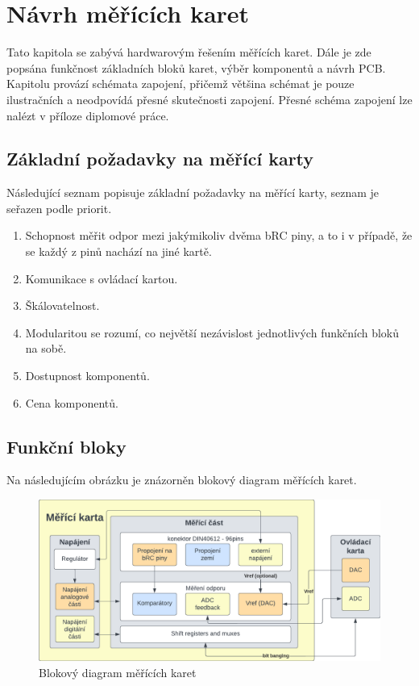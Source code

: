
\chapter{Návrh měřících karet}
Tato kapitola se zabývá hardwarovým řešením měřících karet. Dále je zde popsána funkčnost základních bloků karet, výběr komponentů a návrh PCB.
Kapitolu provází schémata zapojení, přičemž většina schémat je pouze ilustračních a neodpovídá přesné skutečnosti zapojení.
Přesné schéma zapojení lze nalézt v příloze diplomové práce.

\section{Základní požadavky na měřící karty}
Následující seznam popisuje základní požadavky na měřící karty, seznam je seřazen podle priorit.
\begin{enumerate}
    \item Schopnost měřit odpor mezi jakýmikoliv dvěma bRC piny, a to i v případě, že se každý z pinů nachází na jiné kartě.
    \item Komunikace s ovládací kartou.
    \item Škálovatelnost.
    \item Modularitou se rozumí, co největší nezávislost jednotlivých funkčních bloků na sobě.
    \item Dostupnost komponentů. 
    \item Cena komponentů. 
\end{enumerate}

\section{Funkční bloky}
Na následujícím obrázku je znázorněn blokový diagram měřících karet.
\begin{figure}[ht!]
        \centering
        \includegraphics[width = 1\textwidth]{obrazky/karta_system_diagram.png}
        \caption{Blokový diagram měřících karet}
        \label{fig:Blokový diagram měřících karet}
\end{figure}

